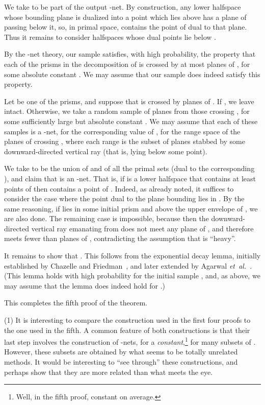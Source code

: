 \documentclass[12pt]{article}
\newcommand{\etal}{\textit{et~al.}\xspace}
\begin{document}
We take  to be part of the output -net.  By construction,
any lower halfspace  whose bounding plane is dualized into a point
 which lies above  has a plane of  passing below it,
so, in primal space,  contains the point of  dual to that
plane.  Thus it remains to consider halfspaces whose dual points lie
below .

By the -net theory, our sample  satisfies, with high
probability, the property that each of the prisms  in the
decomposition of  is crossed by at most 
planes of , for some absolute constant .
We may assume that our sample does indeed satisfy this property.

Let  be one of the prisms, and suppose that  is crossed
by  planes of . If , we leave  intact.
Otherwise, we take a random sample  of  planes
from those crossing , for some sufficiently large but absolute
constant . We may assume that each of these samples is a
-net, for the corresponding value of , for the range space
of the planes of  crossing , where each range is the subset
of planes stabbed by some downward-directed vertical ray (that is, lying below some point).

We take  to be the union of  and of all the primal sets
 (dual to the corresponding ),
and claim that  is an -net. That
is, if  is a lower halfspace that contains at least  points
of  then  contains a point of . Indeed, as already noted,
it suffices to consider the case where the point  dual to the
plane bounding  lies in . By the same reasoning, if 
lies in some initial prism  and above the upper envelope
 of , we are also done. The remaining case is
impossible, because then the downward-directed vertical ray emanating
from  does not meet any plane of , and therefore meets
fewer than  planes of , contradicting the assumption that
 is ``heavy''.

It remains to show that . This follows from the exponential
decay lemma, initially established by Chazelle and
Friedman~\cite{cf-dvrsi-90}, and later extended by Agarwal
\etal~\cite{ams-cmfal-98}.  (This lemma holds with high probability
for the initial sample , and, as above, we may assume that the
lemma does indeed hold for .)

This completes the fifth proof of the theorem.


\medskip

(1) It is interesting to compare the construction used in the first
four proofs to the one used in the fifth. A common feature of both
constructions is that their last step involves the construction of
-nets, for  a {\em constant},\footnote{Well, in the fifth proof, constant on average.}
for many subsets of .
However, these subsets are obtained by what seems to be totally
unrelated methods. It would be interesting to ``see through'' these
constructions, and perhaps show that they are more related than what
meets the eye. 
\end{document}
